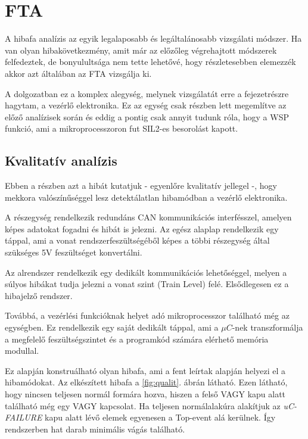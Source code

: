 \section{FTA}
A hibafa analízis az egyik legalaposabb és legáltalánosabb vizsgálati módszer.
Ha van olyan hibakövetkezmény, amit már az előzőleg végrehajtott módszerek felfedeztek, de bonyulultsága nem tette lehetővé, hogy részletesebben elemezzék akkor azt általában az FTA vizsgálja ki.

A dolgozatban ez a komplex alegység, melynek vizsgálatát erre a fejezetrészre hagytam, a vezérlő elektronika.
Ez az egység csak részben lett megemlítve az előző analízisek során és eddig a pontig csak annyit tudunk róla, hogy a WSP funkció, ami a mikroprocesszoron fut SIL2-es besorolást kapott.

\subsection{Kvalitatív analízis}
Ebben a részben azt a hibát kutatjuk - egyenlőre kvalitatív jellegel -, hogy mekkora valószínűséggel lesz detektálatlan hibamódban a vezérlő elektronika.

A részegység rendelkezik redundáns CAN kommunikációs interfésszel, amelyen képes adatokat fogadni és hibát is jelezni.
Az egész alaplap rendelkezik egy táppal, ami a vonat rendszerfeszültségéből képes a többi részegység által szükséges 5V feszültséget konvertálni.

Az alrendszer rendelkezik egy dedikált kommunikációs lehetőséggel, melyen a súlyos hibákat tudja jelezni a vonat szint (Train Level) felé. 
Elsődlegesen ez a hibajelző rendszer.

Továbbá, a vezérlési funkcióknak helyet adó mikroprocesszor található még az egységben.
Ez rendelkezik egy saját dedikált táppal, ami a $\mu C$-nek transzformálja a megfelelő feszültségszintet és a programkód számára elérhető memória modullal.

Ez alapján konstruálható olyan hibafa, ami a fent leírtak alapján helyezi el a hibamódokat.
Az elkészített hibafa a \ref{fig:qualit}. ábrán látható. Ezen látható, hogy nincsen teljesen normál formára hozva, hiszen a felső VAGY kapu alatt található még egy VAGY kapcsolat.
Ha teljesen normálalakúra alakítjuk az \emph{uC-FAILURE} kapu alatt lévő elemek egyenesen a Top-event alá kerülnek.
Így rendszerben hat darab minimális vágás található.

